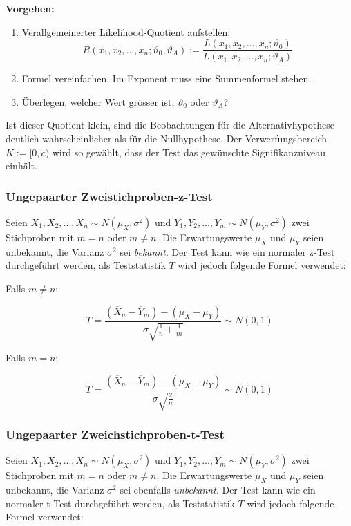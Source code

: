 \documentclass[10pt,a4paper,twocolumn]{article}
\begin{document}
\textbf{Vorgehen:}
\begin{enumerate}
\item Verallgemeinerter Likelihood-Quotient aufstellen:
\[
R(x_1,x_2,...,x_n;\vartheta_0,\vartheta_A):=\frac{L(x_1,x_2,...,x_n;\vartheta_0)}{L(x_1,x_2,...,x_n;\vartheta_A)}
\]
\item Formel vereinfachen. Im Exponent muss eine Summenformel stehen.
\item Überlegen, welcher Wert grösser ist, $\vartheta_0$ oder $\vartheta_A$?                  
\end{enumerate}

Ist dieser Quotient klein, sind die Beobachtungen für die Alternativhypothese deutlich wahrscheinlicher als für die Nullhypothese. Der Verwerfungsbereich $K:=[0,c)$ wird so gewählt, dass der Test das gewünschte Signifikanzniveau einhält.

\subsubsection{Ungepaarter Zweistichproben-z-Test}
Seien $X_1,X_2,...,X_n \sim N(\mu_X,\sigma^2)$ und $Y_1,Y_2,...,Y_m \sim N(\mu_Y,\sigma^2)$ zwei Stichproben mit $m = n$ oder $m \neq n$. Die Erwartungswerte $\mu_X$ und $\mu_Y$ seien unbekannt, die Varianz $\sigma^2$ sei \emph{bekannt}. Der Test kann wie ein normaler z-Test durchgeführt werden, als Teststatistik $T$ wird jedoch folgende Formel verwendet:

\vspace{10pt}

Falls $m\neq n$:

\[
T = \frac{\left(\overline{X}_n-\overline{Y}_m\right)-\left(\mu_X-\mu_Y\right)}{\sigma\sqrt{\frac{1}{n}+\frac{1}{m}}}\sim N(0,1)
\]

Falls $m=n$:

\[
T = \frac{\left(\overline{X}_n-\overline{Y}_m\right)-\left(\mu_X-\mu_Y\right)}{\sigma\sqrt{\frac{2}{n}}}\sim N(0,1)
\]

\subsubsection{Ungepaarter Zweichstichproben-t-Test}
Seien $X_1,X_2,...,X_n \sim N(\mu_X,\sigma^2)$ und $Y_1,Y_2,...,Y_m \sim N(\mu_Y,\sigma^2)$ zwei Stichproben mit $m = n$ oder $m \neq n$. Die Erwartungswerte $\mu_X$ und $\mu_Y$ seien unbekannt, die Varianz $\sigma^2$ sei ebenfalls \emph{unbekannt}. Der Test kann wie ein normaler t-Test durchgeführt werden, als Teststatistik $T$ wird jedoch folgende Formel verwendet:
\end{document}
